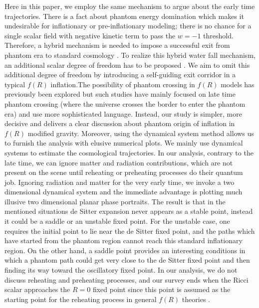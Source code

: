 \documentclass[a4paper,11pt]{article}
\begin{document}
 Here in this paper, we employ the same mechanism to argue about the early time trajectories. There is a fact about phantom energy domination which makes it undesirable for inflationary or pre-inflationary modeling; there is no chance for a single scalar field with negative kinetic term to pass the $w=-1$ threshold. Therefore, a hybrid mechanism is needed to impose a successful exit from phantom era to standard cosmology \cite{pio,clo}. To realize this hybrid water fall mechanism, an additional scalar degree of freedom has to be proposed \cite{pio}. We aim to omit this additional degree of freedom by introducing a self-guiding exit corridor in a typical $f(R)$ inflation.The possibility of phantom crossing in $f(R)$ models has previously been explored \cite{cpdm,Nod} but such studies have mainly focused on late time phantom crossing (where the universe crosses the border to enter the phantom era) and use more sophisticated language. Instead, our study is simpler, more decisive and delivers a clear discussion about phantom origin of inflation in $f(R)$ modified gravity. Moreover, using the dynamical system method \cite{mgwn} allows us to furnish the analysis with elusive numerical plots. We mainly use dynamical systems to estimate the cosmological trajectories. In our analysis, contrary to the late time, we can ignore matter and radiation contributions, which are not present on the scene until reheating or preheating processes do their quantum job. Ignoring radiation and matter for the very early time, we invoke a two dimensional dynamical system and the immediate advantage is plotting much illusive two dimensional planar phase portraits. The result is that in the mentioned situations de Sitter expansion never appears as a stable point, instead it could be a saddle or an unstable fixed point. For the unstable case, one requires the initial point to lie near the de Sitter fixed point, and the paths which have started from the phantom region cannot reach this standard inflationary region. On the other hand, a saddle point provides an interesting conditions in which a phantom path could get very close to the de Sitter fixed point and then finding its way toward the oscillatory fixed point. In our analysis, we do not discuss reheating and preheating processes, and our survey ends when the Ricci scalar approaches the $R=0$ fixed point since this point is assumed as the starting point for the reheating process in general $f(R)$ theories \cite{imgg,reh,fel}.
\end{document}
